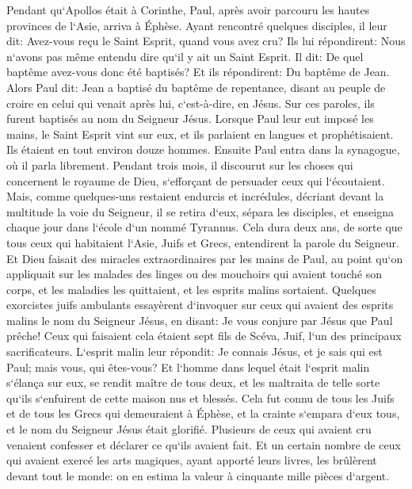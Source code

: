 \verse Pendant qu`Apollos était à Corinthe, Paul, après avoir parcouru les hautes provinces de l`Asie, arriva à Éphèse. Ayant rencontré quelques disciples, il leur dit: 
\verse Avez-vous reçu le Saint Esprit, quand vous avez cru? Ils lui répondirent: Nous n`avons pas même entendu dire qu`il y ait un Saint Esprit. 
\verse Il dit: De quel baptême avez-vous donc été baptisés? Et ils répondirent: Du baptême de Jean. 
\verse Alors Paul dit: Jean a baptisé du baptême de repentance, disant au peuple de croire en celui qui venait après lui, c`est-à-dire, en Jésus. 
\verse Sur ces paroles, ils furent baptisés au nom du Seigneur Jésus. 
\verse Lorsque Paul leur eut imposé les mains, le Saint Esprit vint sur eux, et ils parlaient en langues et prophétisaient. 
\verse Ils étaient en tout environ douze hommes. 
\verse Ensuite Paul entra dans la synagogue, où il parla librement. Pendant trois mois, il discourut sur les choses qui concernent le royaume de Dieu, s`efforçant de persuader ceux qui l`écoutaient. 
\verse Mais, comme quelques-uns restaient endurcis et incrédules, décriant devant la multitude la voie du Seigneur, il se retira d`eux, sépara les disciples, et enseigna chaque jour dans l`école d`un nommé Tyrannus. 
\verse Cela dura deux ans, de sorte que tous ceux qui habitaient l`Asie, Juifs et Grecs, entendirent la parole du Seigneur. 
\verse Et Dieu faisait des miracles extraordinaires par les mains de Paul, 
\verse au point qu`on appliquait sur les malades des linges ou des mouchoirs qui avaient touché son corps, et les maladies les quittaient, et les esprits malins sortaient. 
\verse Quelques exorcistes juifs ambulants essayèrent d`invoquer sur ceux qui avaient des esprits malins le nom du Seigneur Jésus, en disant: Je vous conjure par Jésus que Paul prêche! 
\verse Ceux qui faisaient cela étaient sept fils de Scéva, Juif, l`un des principaux sacrificateurs. 
\verse L`esprit malin leur répondit: Je connais Jésus, et je sais qui est Paul; mais vous, qui êtes-vous? 
\verse Et l`homme dans lequel était l`esprit malin s`élança sur eux, se rendit maître de tous deux, et les maltraita de telle sorte qu`ils s`enfuirent de cette maison nus et blessés. 
\verse Cela fut connu de tous les Juifs et de tous les Grecs qui demeuraient à Éphèse, et la crainte s`empara d`eux tous, et le nom du Seigneur Jésus était glorifié. 
\verse Plusieurs de ceux qui avaient cru venaient confesser et déclarer ce qu`ils avaient fait. 
\verse Et un certain nombre de ceux qui avaient exercé les arts magiques, ayant apporté leurs livres, les brûlèrent devant tout le monde: on en estima la valeur à cinquante mille pièces d`argent. 
